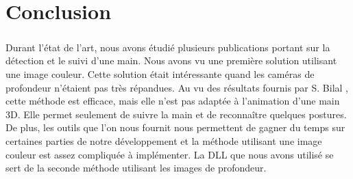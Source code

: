 \chapter*{Conclusion}
\paragraph{}
Durant l'état de l'art, nous avons étudié plusieurs publications portant sur la détection et le suivi
d'une main. Nous avons vu une première solution utilisant une image couleur. Cette solution était
intéressante quand les caméras de profondeur n'étaient pas très répandues. Au vu des résultats fournis par S. Bilal
\cite{haarlike}, cette méthode est efficace, mais elle n'est pas adaptée à l'animation d'une main 3D. Elle permet seulement
de suivre la main et de reconnaître quelques postures. De plus, les outils que l'on nous fournit nous permettent
de gagner du temps sur certaines parties de notre développement et la méthode utilisant une image couleur
est assez compliquée à implémenter. La DLL que nous avons utilisé se sert de la seconde méthode utilisant les images de profondeur.


